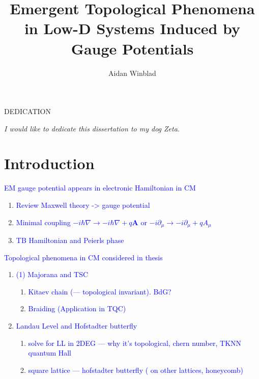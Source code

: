 \documentclass[12pt,doctor]{thesis}
\title{Emergent Topological Phenomena in Low-D Systems Induced by Gauge Potentials}
\author{Aidan Winblad}
\newcommand{\Blue}[1]{\textcolor{blue}{#1}}
\renewcommand{\vec}[1]{\mathbf{#1}}
\newcommand{\MN}{\mathcal{M}}
\begin{document}
\frontmatter

\maketitle              %
\makemycopyright        %
\makeabstract           %
\makeacknowledgements   %

\begin{flatcenter} %

    DEDICATION

    \vfill %

    \noindent \textit{I would like to dedicate this dissertation to my dog Zeta.}
    \vfill %
\end{flatcenter}
\newpage

\tableofcontents    %
\listoftables       %
\listoffigures      %

\mainmatter %


\chapter{Introduction}
\Blue{EM gauge potential appears in electronic Hamiltonian in CM}
\begin{enumerate}
  \item \Blue{Review Maxwell theory -> gauge potential}
  \item \Blue{Minimal coupling $-i \hbar \nabla \rightarrow -i \hbar \nabla + q \vec{A}$ or $-i\partial_{\mu} \rightarrow -i\partial_{\mu} + qA_{\mu}$}
  \item \Blue{TB Hamiltonian and Peierls phase}
\end{enumerate}

\Blue{Topological phenomena in CM considered in thesis}
\begin{enumerate}
  \item \Blue{(1) Majorana and TSC}
  \begin{enumerate}[i]
    \item \Blue{Kitaev chain (\MN --- topological invariant). BdG?}
    \item \Blue{Braiding (Application in TQC)}
  \end{enumerate}
  \item \Blue{Landau Level and Hofstadter butterfly}
  \begin{enumerate}[i]
    \item \Blue{solve for LL in 2DEG --- why it's topological, chern number, TKNN quantum Hall}
    \item \Blue{square lattice --- hofstadter butterfly ( on other lattices, honeycomb)}
  \end{enumerate}
\end{enumerate}
\end{document}
